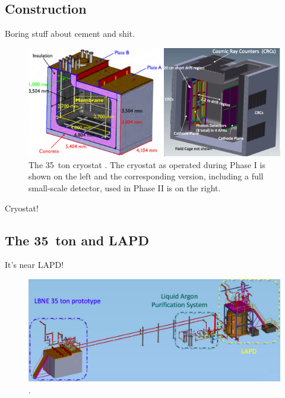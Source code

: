 \subsection{Construction}\label{sec:35tonCryostatConstruction}

Boring stuff about cement and shit.

\begin{figure}[ht]
  \centering
  \includegraphics[width=15cm]{35tonCryostat.png}
  \caption[The 35~ton cryostat]{The 35~ton cryostat \cite{LBNE35tonPhaseI}.  The cryostat as operated during Phase I is shown on the left and the corresponding version, including a full small-scale detector, used in Phase II is on the right.}
  \label{fig:35tonCryostat}
\end{figure}

Cryostat!

\subsection{The 35~ton and LAPD}\label{35tonLAPD}

It's near LAPD!

\begin{figure}[ht]
  \centering
  \includegraphics[width=15cm]{35tonLAPD.png}
  \caption[]{\cite{LBNE35tonPhaseI}.}
  \label{fig:35tonLAPD}
\end{figure}

